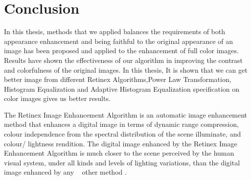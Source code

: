 \chapter{Conclusion}
In this thesis, methods that we applied balances the requirements of both appearance
enhancement and being faithful to the original appearance of an image has been
proposed and applied to the enhancement of full color images. Results have shown
the effectiveness of our algorithm in improving the contrast and colorfulness of
the original images. In this thesis, It is shown that we can get better image
from different Retinex Algorithms,Power Law Transformation, Histogram Equalization and Adaptive Histogram Equalization specification on color images gives us better results.

The Retinex Image Enhancement Algorithm is an automatic image enhancement method that enhances a digital image in terms of dynamic range compression, colour independence from the spectral distribution of the scene illuminate, and colour/ lightness rendition. The digital image enhanced by the Retinex Image Enhancement Algorithm is much closer to the scene perceived by the human visual system, under all kinds and levels of lighting variations, than the digital image enhanced by any ~\cite{lime} other method \cite{retinex}.
